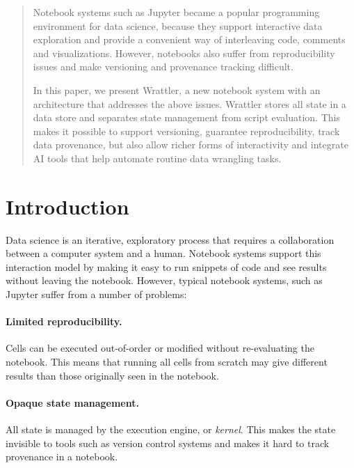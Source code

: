 \documentclass[sigplan]{acmart}\settopmatter{printfolios=true,printccs=false,printacmref=false}
\begin{document}
\begin{abstract}
Notebook systems such as Jupyter became a popular programming environment for data science, because 
they support interactive data exploration and provide a convenient way of interleaving code, 
comments and visualizations. However, notebooks also suffer from reproducibility issues and make
versioning and provenance tracking difficult.

In this paper, we present Wrattler, a new notebook system with an architecture that addresses the
above issues. Wrattler stores all state in a data store and separates state management from 
script evaluation. This makes it possible to support versioning, guarantee reproducibility, track 
data provenance, but also allow richer forms of interactivity and integrate AI tools that help
automate routine data wrangling tasks.
\end{abstract}
\maketitle

\section{Introduction}
Data science is an iterative, exploratory process that requires a collaboration between a computer
system and a human. Notebook systems support this interaction model by making it easy to run 
snippets of code and see results without leaving the notebook. However, typical notebook systems,
such as Jupyter suffer from a number of problems:

\paragraph{Limited reproducibility.} Cells can be executed out-of-order or modified without re-evaluating 
the notebook. This means that running all cells from scratch may give different results than those 
originally seen in the notebook.

\paragraph{Opaque state management.} All state is managed by the execution engine, or \emph{kernel}.
This makes the state invisible to tools such as version control systems and makes it hard to 
track provenance in a notebook.
\end{document}

